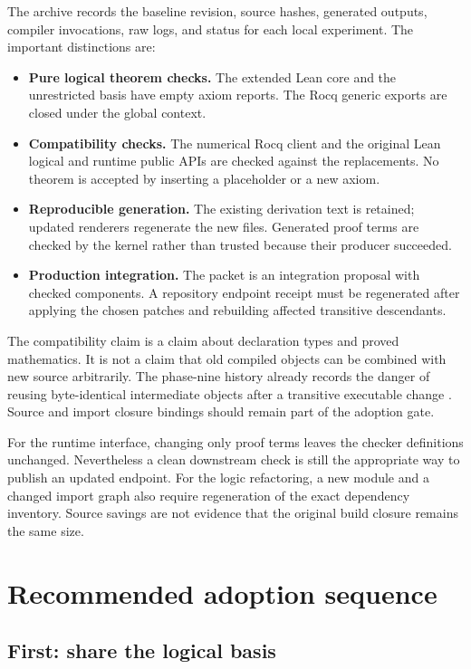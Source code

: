 \documentclass[11pt,letterpaper]{article}
\begin{document}
The archive records the baseline revision, source hashes, generated outputs,
compiler invocations, raw logs, and status for each local experiment. The
important distinctions are:
\begin{itemize}
\item \textbf{Pure logical theorem checks.} The extended Lean core and the
unrestricted basis have empty axiom reports. The Rocq generic exports are closed
under the global context.
\item \textbf{Compatibility checks.} The numerical Rocq client and the original
Lean logical and runtime public APIs are checked against the replacements.
No theorem is accepted by inserting a placeholder or a new axiom.
\item \textbf{Reproducible generation.} The existing derivation text is retained;
updated renderers regenerate the new files. Generated proof terms are checked
by the kernel rather than trusted because their producer succeeded.
\item \textbf{Production integration.} The packet is an integration proposal
with checked components. A repository endpoint receipt must be regenerated after
applying the chosen patches and rebuilding affected transitive descendants.
\end{itemize}

The compatibility claim is a claim about declaration types and proved
mathematics. It is not a claim that old compiled objects can be combined with
new source arbitrarily. The phase-nine history already records the danger of
reusing byte-identical intermediate objects after a transitive executable change
\cite{phase9}. Source and import closure bindings should remain part of the
adoption gate.

For the runtime interface, changing only proof terms leaves the checker
definitions unchanged. Nevertheless a clean downstream check is still the
appropriate way to publish an updated endpoint. For the logic refactoring, a
new module and a changed import graph also require regeneration of the exact
dependency inventory. Source savings are not evidence that the original build
closure remains the same size.

\section{Recommended adoption sequence}

\subsection{First: share the logical basis}
\end{document}
